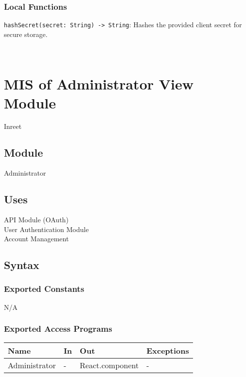 \documentclass[12pt, titlepage]{article}
\begin{document}
\subsubsection{Local Functions}

\texttt{hashSecret(secret: String) -> String}: Hashes the provided client secret for secure storage.

\newpage
~\newpage






\section{MIS of Administrator View Module} \label{administrator_view_module} Inreet

\subsection{Module}
Administrator

\subsection{Uses}
API Module (OAuth)\\
User Authentication Module\\
Account Management\\

\subsection{Syntax}

\subsubsection{Exported Constants}
N/A

\subsubsection{Exported Access Programs}

\begin{center}
\begin{tabular}{p{2cm} p{4cm} p{4cm} p{2cm}}
\hline
\textbf{Name} & \textbf{In} & \textbf{Out} & \textbf{Exceptions} \\
\hline
Administrator & - & React.component & - \\
\hline
\end{tabular}
\end{center}
\end{document}
